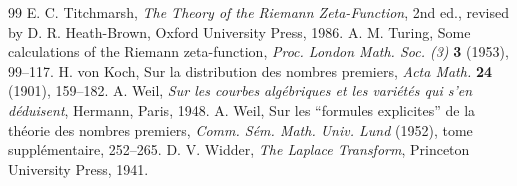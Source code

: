 \documentclass[11pt,a4paper]{article}
\theoremstyle{definition}\newtheorem{definition}[proposition]{Definition}
\theoremstyle{remark}\newtheorem{remark}[proposition]{Remark}
\begin{document}
\begin{thebibliography}{99}
 E. C. Titchmarsh, \emph{The Theory of the Riemann Zeta-Function}, 2nd ed., revised by D. R. Heath-Brown, Oxford University Press, 1986.
 A. M. Turing, Some calculations of the Riemann zeta-function, \emph{Proc. London Math. Soc. (3)} \textbf{3} (1953), 99--117.
 H. von Koch, Sur la distribution des nombres premiers, \emph{Acta Math.} \textbf{24} (1901), 159--182.
 A. Weil, \emph{Sur les courbes alg\'ebriques et les vari\'et\'es qui s'en d\'eduisent}, Hermann, Paris, 1948.
 A. Weil, Sur les ``formules explicites'' de la th\'eorie des nombres premiers, \emph{Comm. S\'em. Math. Univ. Lund} (1952), tome suppl\'ementaire, 252--265.
 D. V. Widder, \emph{The Laplace Transform}, Princeton University Press, 1941.
\end{thebibliography}
\endgroup
\end{document}
